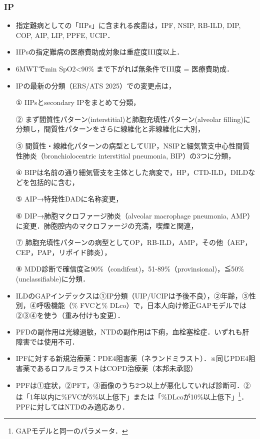\subsubsection{IP}

\begin{itemize}
\item 指定難病としての「IIPs」に含まれる疾患は，IPF, NSIP, RB-ILD, DIP, COP, AIP, LIP, PPFE, UCIP．
\item IIPsの指定難病の医療費助成対象は重症度III度以上．
\item 6MWTでmin SpO2<90\% まで下がれば無条件でIII度 = 医療費助成．
\item IPの最新の分類（ERS/ATS 2025）での変更点は，

① IIPsとsecondary IPをまとめて分類，

② まず間質性パターン(interstitial)と肺胞充填性パターン(alveolar filling)に分類し，間質性パターンをさらに線維化と非線維化に大別，

③ 間質性・線維化パターンの病型としてUIP，NSIPと細気管支中心性間質性肺炎（bronchiolocentric interstitial pneumonia, BIP）の3つに分類，

④ BIPは名前の通り細気管支を主体とした病変で，HP，CTD-ILD，DILDなどを包括的に含む，

⑤ AIP→特発性DADに名称変更，

⑥ DIP→肺胞マクロファージ肺炎（alveolar macrophage pneumonia, AMP）に変更．肺胞腔内のマクロファージの充満，喫煙と関連，

⑦ 肺胞充填性パターンの病型としてOP，RB-ILD，AMP，その他（AEP，CEP，PAP，リポイド肺炎），

⑧ MDD診断で確信度≧90\%（condifent)，51-89\%（provinsional)，≦50\% (unclassifiable)に分類．

\item ILDのGAPインデックスは①IP分類（UIP/UCIPは予後不良），②年齢，③性別，④呼吸機能（\% FVCと\% DLco）で，日本人向け修正GAPモデルでは②③④を使う（重み付けも変更）．

\item PFDの副作用は光線過敏，NTDの副作用は下痢，血栓塞栓症．いずれも肝障害では使用不可．
\item IPFに対する新規治療薬：PDE4阻害薬（ネランドミラスト）．※同じPDE4阻害薬であるロフルミラストはCOPD治療薬（本邦未承認）
\item PPFは①症状，②PFT，③画像のうち2つ以上が悪化していれば診断可．②は「1年以内に\%FVCが5\%以上低下」または「\%DLcoが10\%以上低下」\footnote{GAPモデルと同一のパラメータ．}．PPFに対してはNTDのみ適応あり．


\end{itemize}
